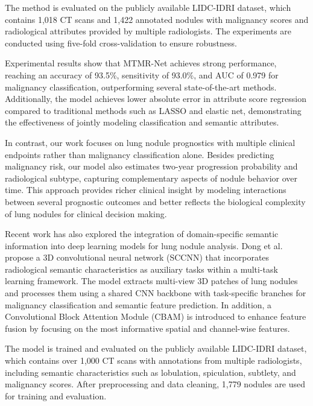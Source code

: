 The method is evaluated on the publicly available LIDC-IDRI dataset, which contains 1,018 CT scans and 1,422 annotated nodules with malignancy scores and radiological attributes provided by multiple radiologists. The experiments are conducted using five-fold cross-validation to ensure robustness.

Experimental results show that MTMR-Net achieves strong performance, reaching an accuracy of 93.5\%, sensitivity of 93.0\%, and AUC of 0.979 for malignancy classification, outperforming several state-of-the-art methods. Additionally, the model achieves lower absolute error in attribute score regression compared to traditional methods such as LASSO and elastic net, demonstrating the effectiveness of jointly modeling classification and semantic attributes.

In contrast, our work focuses on lung nodule prognostics with multiple clinical endpoints rather than malignancy classification alone. Besides predicting malignancy risk, our model also estimates two-year progression probability and radiological subtype, capturing complementary aspects of nodule behavior over time. This approach provides richer clinical insight by modeling interactions between several prognostic outcomes and better reflects the biological complexity of lung nodules for clinical decision making.

\vspace{0.5cm}

Recent work has also explored the integration of domain-specific semantic information into deep learning models for lung nodule analysis. Dong et al.~\cite{dong2023} propose a 3D convolutional neural network (SCCNN) that incorporates radiological semantic characteristics as auxiliary tasks within a multi-task learning framework. The model extracts multi-view 3D patches of lung nodules and processes them using a shared CNN backbone with task-specific branches for malignancy classification and semantic feature prediction. In addition, a Convolutional Block Attention Module (CBAM) is introduced to enhance feature fusion by focusing on the most informative spatial and channel-wise features.

The model is trained and evaluated on the publicly available LIDC-IDRI dataset, which contains over 1,000 CT scans with annotations from multiple radiologists, including semantic characteristics such as lobulation, spiculation, subtlety, and malignancy scores. After preprocessing and data cleaning, 1,779 nodules are used for training and evaluation.

